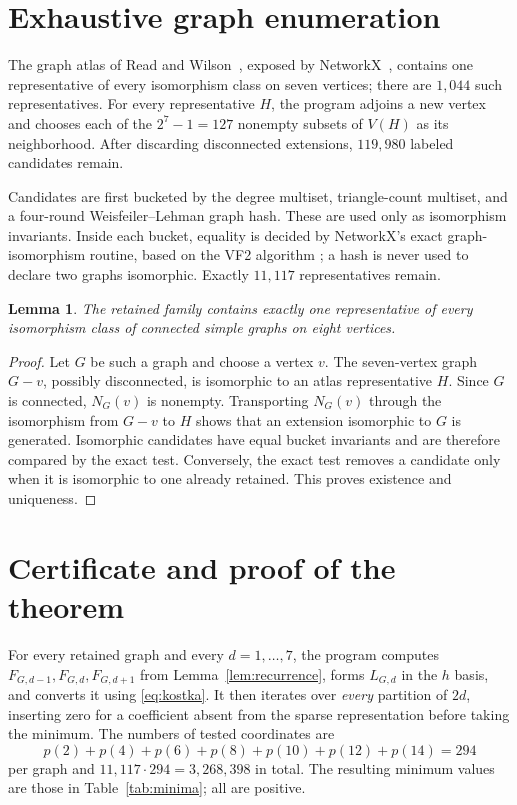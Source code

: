\documentclass[11pt]{article}
\newtheorem{lemma}[theorem]{Lemma}
\begin{document}
\section{Exhaustive graph enumeration}

The graph atlas of Read and Wilson~\cite{read-wilson1998}, exposed by
NetworkX~\cite{hagberg-schult-swart2008}, contains one representative of every
isomorphism class on seven vertices; there are $1{,}044$ such representatives.
For every representative $H$, the program adjoins a new vertex and chooses
each of the $2^7-1=127$ nonempty subsets of $V(H)$ as its neighborhood.  After
discarding disconnected extensions, $119{,}980$ labeled candidates remain.

Candidates are first bucketed by the degree multiset, triangle-count
multiset, and a four-round Weisfeiler--Lehman graph hash.  These are used only
as isomorphism invariants.  Inside each bucket, equality is decided by
NetworkX's exact graph-isomorphism routine, based on the VF2 algorithm
\cite{cordella-et-al2004}; a hash is never used to declare two graphs
isomorphic.  Exactly $11{,}117$ representatives remain.

\begin{lemma}\label{lem:graphs}
The retained family contains exactly one representative of every isomorphism
class of connected simple graphs on eight vertices.
\end{lemma}

\begin{proof}
Let $G$ be such a graph and choose a vertex $v$.  The seven-vertex graph
$G-v$, possibly disconnected, is isomorphic to an atlas representative $H$.
Since $G$ is connected, $N_G(v)$ is nonempty.  Transporting $N_G(v)$ through
the isomorphism from $G-v$ to $H$ shows that an extension isomorphic to $G$
is generated.  Isomorphic candidates have equal bucket invariants and are
therefore compared by the exact test.  Conversely, the exact test removes a
candidate only when it is isomorphic to one already retained.  This proves
existence and uniqueness.
\end{proof}

\section{Certificate and proof of the theorem}

For every retained graph and every $d=1,\ldots,7$, the program computes
$F_{G,d-1},F_{G,d},F_{G,d+1}$ from Lemma~\ref{lem:recurrence}, forms
$L_{G,d}$ in the $h$ basis, and converts it using \eqref{eq:kostka}.  It then
iterates over \emph{every} partition of $2d$, inserting zero for a coefficient
absent from the sparse representation before taking the minimum.  The numbers
of tested coordinates are
\[
 p(2)+p(4)+p(6)+p(8)+p(10)+p(12)+p(14)=294
\]
per graph and $11{,}117\cdot294=3{,}268{,}398$ in total.  The resulting
minimum values are those in Table~\ref{tab:minima}; all are positive.
\end{document}
